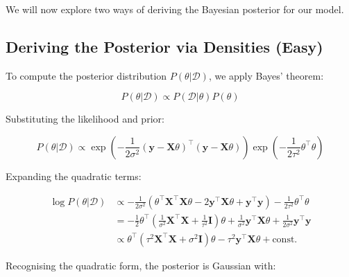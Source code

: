 We will now explore two ways of deriving the Bayesian posterior for our model.
\subsection{Deriving the Posterior via Densities (Easy)}

To compute the posterior distribution \( P(\theta|\mathcal{D}) \), we apply Bayes' theorem:

\[
    P(\theta|\mathcal{D}) \propto P(\mathcal{D}|\theta) P(\theta)
\]

Substituting the likelihood and prior:

\[
    P(\theta|\mathcal{D}) \propto \exp\left( -\frac{1}{2\sigma^2} (\boldsymbol{y} - \boldsymbol{X}\theta)^\top (\boldsymbol{y} - \boldsymbol{X}\theta) \right) \exp\left( -\frac{1}{2\tau^2} \theta^\top \theta \right)
\]

Expanding the quadratic terms:

\begin{align*}
    \log P(\theta|\mathcal{D}) & \propto -\frac{1}{2\sigma^2} \left( \theta^\top \boldsymbol{X}^\top \boldsymbol{X} \theta - 2 \boldsymbol{y}^\top \boldsymbol{X} \theta + \boldsymbol{y}^\top \boldsymbol{y} \right) - \frac{1}{2\tau^2} \theta^\top \theta                \\
                               & = -\frac{1}{2} \theta^\top \left( \frac{1}{\sigma^2} \boldsymbol{X}^\top \boldsymbol{X} + \frac{1}{\tau^2} \mathbf{I} \right) \theta + \frac{1}{\sigma^2} \boldsymbol{y}^\top \boldsymbol{X} \theta + \frac{1}{2\sigma^2}\bm{y}^\top\bm{y}
    \\
                               & \propto \theta^\top \left(  \tau^2 \boldsymbol{X}^\top \boldsymbol{X} +\sigma^2\mathbf{I} \right) \theta - \tau^2 \boldsymbol{y}^\top \boldsymbol{X} \theta +
    \text{const.}
\end{align*}

Recognising the quadratic form, the posterior is Gaussian with: 

